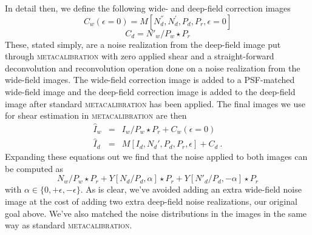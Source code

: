 \documentclass[twocolumn]{openjournal}
\makeatletter
\newcommand{\mcal}{\textsc{metacalibration}\@\xspace}
\makeatother
\begin{document}
In detail then, we define the following wide- and deep-field correction images
\begin{equation}\label{eqn:cw}
C_{w}(\epsilon=0) = M[N^{''}_d, N^{'}_d, P_d, P_{r}, \epsilon=0]
\end{equation}
\begin{equation}\label{eqn:cd}
C_{d} = N'_{w}/P_{w} \star P_{r}
\end{equation}
These, stated simply, are a noise realization from the deep-field image put through
\mcal with zero applied shear and a straight-forward deconvolution and reconvolution
operation done on a noise realization from the wide-field images. The wide-field
correction image is added to a PSF-matched wide-field image and the deep-field
correction image is added to the deep-field image after standard \mcal has been applied.
The final images we use for shear estimation in \mcal are then
\begin{eqnarray}
\hat I_{w} & = & I_{w}/P_{w} \star P_{r} + C_{w}(\epsilon=0)\\
\hat I_{d} & = & M[I_{d}, N_{d}', P_{d}, P_{r}, \epsilon] + C_{d}\ .
\end{eqnarray}
Expanding these equations out we find that the noise applied to both images can be
computed as
\begin{equation*}
N_{w}/P_{w}\star P_{r} + Y[N_{d}/P_{d}, \alpha] \star P_{r} + Y[N'_d/P_d, -\alpha] \star P_{r}
\end{equation*}
with $\alpha\in\{0,+\epsilon,-\epsilon\}$. As is clear, we've avoided adding an extra
wide-field noise image at the cost of adding two extra deep-field noise realizations,
our original goal above. We've also matched the noise distributions in the images in the
same way as standard \mcal.
\end{document}
